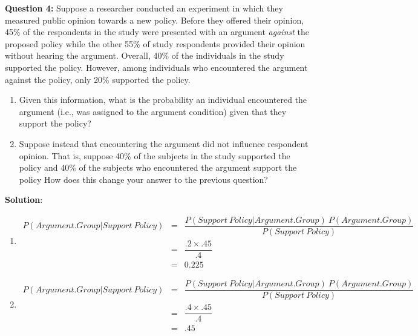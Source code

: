 \documentclass[10pt]{amsart}
\begin{document}
\textbf{Question 4:}
Suppose a researcher conducted an experiment in which they measured public opinion towards a new policy. Before they offered their opinion, 45\% of the respondents in the study were presented with an argument \textit{against} the proposed policy while the other 55\% of study respondents provided their opinion without hearing the argument.  Overall, 40\% of the individuals in the study supported the policy. However, among individuals who encountered the argument against the policy, only 20\% supported the policy. 

\begin{enumerate}

\item Given this information, what is the probability an individual encountered the argument (i.e., was assigned to the argument condition) given that they support the policy?

\item Suppose instead that encountering the argument did not influence respondent opinion. That is, suppose 40\% of the subjects in the study supported the policy and 40\% of the subjects who encountered the argument support the policy How does this change your answer to the previous question? 
\end{enumerate}

\textbf{Solution}:\\
\begin{enumerate}
\item
\begin{eqnarray*}
P(Argument.Group | Support \ Policy ) &=& \dfrac{P(Support \ Policy | Argument.Group) \  P(Argument.Group)}{P(Support \ Policy)}\\
&=& \dfrac{.2 \times .45}{.4}\\
&=& 0.225
\end{eqnarray*}
\item
\begin{eqnarray*}
P(Argument.Group | Support \ Policy ) &=& \dfrac{P(Support \ Policy | Argument.Group) \  P(Argument.Group)}{P(Support \ Policy)}\\
&=& \dfrac{.4 \times .45}{.4}\\
&=& .45
\end{eqnarray*}

\end{enumerate}
\end{document}
